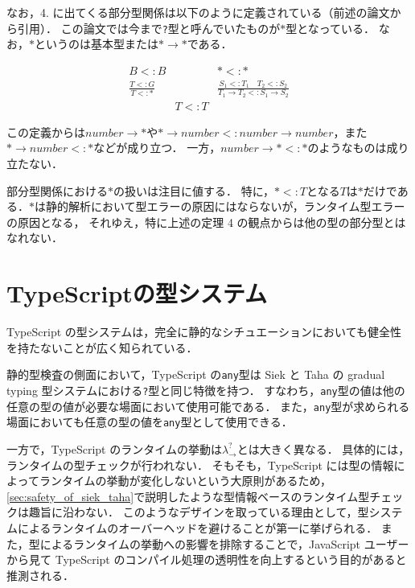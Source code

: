 なお，4. に出てくる部分型関係は以下のように定義されている（前述の論文\cite{siek_et_al:LIPIcs.SNAPL.2015.274}から引用）．
この論文では今まで\texttt{?}型と呼んでいたものが$*$型となっている．
なお，$*$というのは基本型または$* \to *$である．

\[
    \begin{array}{ccc}
        B <: B                & \quad          & * <: *                                                         \\[1em]
        \frac{T <: G}{T <: *} & \quad          & \frac{S_1 <: T_1 \quad T_2 <: S_2}{T_1 \to T_2 <: S_1 \to S_2} \\[2em]
                              & \boxed{T <: T} &
    \end{array}
\]

この定義からは$number \to *$や$* \to number <: number \to number$，また$* \to number <: *$などが成り立つ．
一方，$number \to * <: *$のようなものは成り立たない．

部分型関係における$*$の扱いは注目に値する．
特に，$* <: T$となる$T$は$*$だけである．$*$は静的解析において型エラーの原因にはならないが，ランタイム型エラーの原因となる，
それゆえ，特に上述の定理 4 の観点からは他の型の部分型とはなれない．

\section{TypeScriptの型システム}

TypeScript の型システムは，完全に静的なシチュエーションにおいても健全性を持たないことが広く知られている．

静的型検査の側面において，TypeScript の\texttt{any}型は Siek と Taha の gradual typing 型システムにおける\texttt{?}型と同じ特徴を持つ．
すなわち，\texttt{any}型の値は他の任意の型の値が必要な場面において使用可能である．
また，\texttt{any}型が求められる場面においても任意の型の値を\texttt{any}型として使用できる．

一方で，TypeScript のランタイムの挙動は$\lambda^?_\to$とは大きく異なる．
具体的には，ランタイムの型チェックが行われない．
そもそも，TypeScript には型の情報によってランタイムの挙動が変化しないという大原則があるため，\ref{sec:safety_of_siek_taha}で説明したような型情報ベースのランタイム型チェックは趣旨に沿わない．
このようなデザインを取っている理由として，型システムによるランタイムのオーバーヘッドを避けることが第一に挙げられる．
また，型によるランタイムの挙動への影響を排除することで，JavaScript ユーザーから見て TypeScript のコンパイル処理の透明性を向上するという目的があると推測される．

